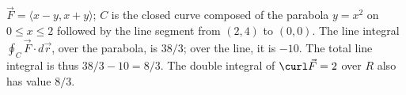 {$\vec F = \langle x-y,x+y\rangle$; $C$ is the closed curve composed of the parabola $y=x^2$ on $0\leq x\leq 2$ followed by the line segment from $(2,4)$ to $(0,0)$.
}
{The line integral $\oint_C\vec F\cdot d\vec r$, over the parabola, is $38/3$; over the line, it is $-10$. The total line integral is thus $38/3-10 = 8/3$. The double integral of $\curl \vec F = 2$ over $R$ also has value $8/3$.
}
